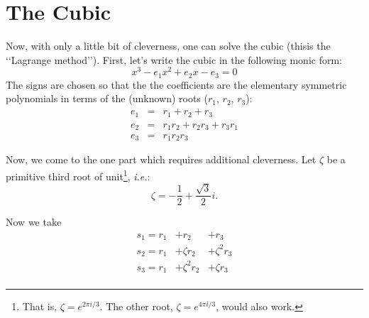 \documentclass{article}
\begin{document}
\section{The Cubic}
Now, with only a little bit of cleverness, one can solve the
cubic (thisis the \lq\lq Lagrange method\rq\rq{}).
First, let's write the cubic in the following monic form:
\begin{equation}
  x^3 - e_1 x^2 + e_2 x - e_3 = 0
\end{equation}
The signs are chosen so that the the coefficients are the
elementary symmetric polynomials in terms of the 
(unknown) roots ($r_1$, $r_2$, $r_3$):
\begin{eqnarray}
 e_1 & = & r_1 + r_2 + r_3 \\
 e_2 & = & r_1 r_2 + r_2 r_3 + r_3 r_1 \\
 e_3 & = & r_1 r_2 r_3 
\end{eqnarray}

Now, we come to the one part which requires additional cleverness.
Let $\zeta$ be a primitive third root of unit\footnote{That is,
$\zeta = e^{2\pi i/3}$.  The other root, 
$\zeta = e^{4\pi i/3}$, would also work.}, \emph{i.e.}:
\begin{equation}
 \zeta = -\frac{1}{2} + \frac{\sqrt{3}}{2}i.
\end{equation}

Now we take 
\begin{eqnarray}
s_1  =  r_1  & + r_2 & +  r_3 \\
s_2  =  r_1  &  + \zeta r_2 & +  \zeta^2 r_3 \\
s_3  =  r_1  & + \zeta^2 r_2 & +  \zeta r_3 \\
\end{eqnarray}
\end{document}
